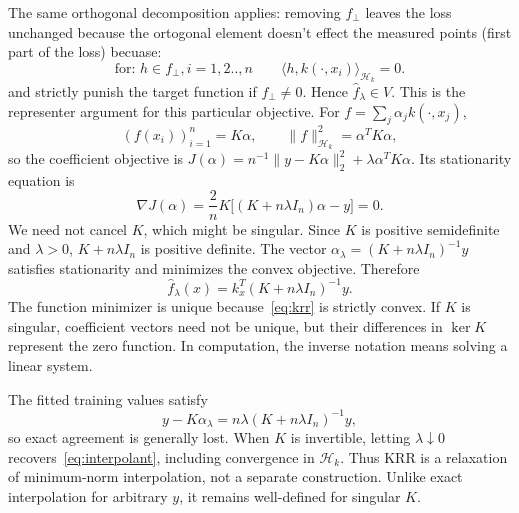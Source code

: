 \documentclass[10pt,a4paper]{article}
\newcommand{\Hk}{\mathcal H_k}
\begin{document}
The same orthogonal decomposition applies: removing $f_\perp$ leaves the loss unchanged because the ortogonal
element doesn't effect the measured points (first part of the loss) becuase:
\[
	\text{for: } h\in f_\perp,i=1,2..,n \qquad \langle h,k(\cdot,x_i)\rangle_{\Hk} = 0.
\]
and strictly punish the target function if $f_\perp\ne0$. Hence $\widehat f_\lambda\in V$. This is the representer argument for this particular objective. For $f=\sum_j\alpha_jk(\cdot,x_j)$,
\[
	(f(x_i))_{i=1}^n=K\alpha,\qquad \|f\|_{\Hk}^2=\alpha^TK\alpha,
\]
so the coefficient objective is
$J(\alpha)=n^{-1}\|y-K\alpha\|_2^2+\lambda\alpha^TK\alpha$.
Its stationarity equation is
\begin{equation}
	\nabla J(\alpha)=\frac2n K\bigl[(K+n\lambda I_n)\alpha-y\bigr]=0.
\end{equation}
We need not cancel $K$, which might be singular. Since $K$ is positive semidefinite and $\lambda>0$, $K+n\lambda I_n$ is positive definite. The vector
$\alpha_\lambda=(K+n\lambda I_n)^{-1}y$ satisfies stationarity and minimizes the convex objective. Therefore
\begin{equation}
	\boxed{\widehat f_\lambda(x)=k_x^T(K+n\lambda I_n)^{-1}y.}
	\label{eq:krr-predictor}
\end{equation}
The function minimizer is unique because~\eqref{eq:krr} is strictly convex. If $K$ is singular, coefficient vectors need not be unique, but their differences in $\ker K$ represent the zero function. In computation, the inverse notation means solving a linear system.

The fitted training values satisfy
\[
	y-K\alpha_\lambda=n\lambda(K+n\lambda I_n)^{-1}y,
\]
so exact agreement is generally lost. When $K$ is invertible, letting $\lambda\downarrow0$ recovers~\eqref{eq:interpolant}, including convergence in $\Hk$. Thus KRR is a
relaxation of minimum-norm interpolation, not a separate construction. Unlike exact interpolation for arbitrary $y$, it remains well-defined for singular $K$.
\end{document}
